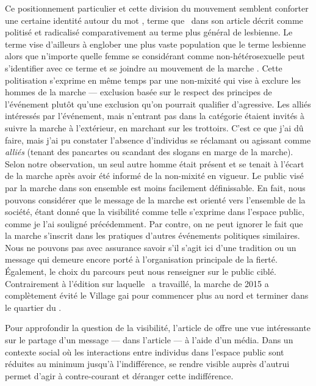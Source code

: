 Ce positionnement particulier et cette division du mouvement semblent conforter une certaine identité autour du mot \dyke{}, terme que~\citet{Podmore2015a} dans son article  décrit comme politisé et radicalisé comparativement au terme plus général de lesbienne.
Le terme \dyke{} vise d'ailleurs à englober une plus vaste population que le terme lesbienne alors que n'importe quelle femme se considérant comme non-hétérosexuelle peut s'identifier avec ce terme et se joindre au mouvement de la marche \dyke{}.
Cette politisation s'exprime en même temps par une non-mixité qui vise à exclure les hommes de la marche --- exclusion basée sur le respect des principes de l'événement plutôt qu'une exclusion qu'on pourrait qualifier d'agressive.
Les alliés intéressés par l'événement, mais n'entrant pas dans la catégorie \dyke{} étaient invités à suivre la marche à l'extérieur, en marchant sur les trottoirs.
C'est ce que j'ai dû faire, mais j'ai pu constater l'absence d'individus se réclamant ou agissant comme \emph{alliés} (tenant des pancartes ou scandant des slogans en marge de la marche).
Selon notre observation, un seul autre homme était présent et se tenait à l'écart de la marche après avoir été informé de la non-mixité en vigueur.
Le public visé par la marche dans son ensemble est moins facilement définissable.
En fait, nous pouvons considérer que le message de la marche est orienté vers l'ensemble de la société, étant donné que la visibilité comme telle s'exprime dans l'espace public, comme je l'ai souligné précédemment.
Par contre, on ne peut ignorer le fait que la marche s'inscrit dans les pratiques d'autres événements politiques similaires.
Nous ne pouvons pas avec assurance savoir s'il s'agit ici d'une tradition ou un message qui demeure encore porté à l'organisation principale de la fierté.
Également, le choix du parcours peut nous renseigner sur le public ciblé.
Contrairement à l'édition sur laquelle~\citet{Podmore2015a} a travaillé, la marche de 2015 a complètement évité le Village gai pour commencer plus au nord et terminer dans le quartier du .

Pour approfondir la question de la visibilité, l'article de \citet{Frosh2006}  offre une vue intéressante sur le partage d'un message ---  dans l'article --- à l'aide d'un média.
Dans un contexte social où les interactions entre individus dans l'espace public sont réduites au minimum jusqu'à l'indifférence, se rendre visible auprès d'autrui permet d'agir à contre-courant et déranger cette indifférence.

